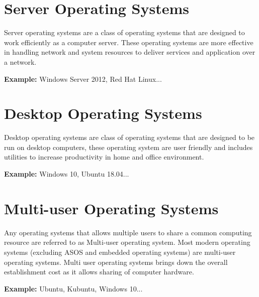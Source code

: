 \documentclass[a4,11pt]{article}
\begin{document}
\begin{multicols}{2}
  \section{Server Operating Systems}

  Server operating systems are a class of operating systems that are
  designed to work efficiently as a computer server. These operating
  systems are more effective in handling network and system resources
  to deliver services and application over a network.

  \textbf{Example:} Windows Server 2012, Red Hat Linux...
  \section{Desktop Operating Systems}
  Desktop operating systems are class of operating systems that are
  designed to be run on desktop computers, these operating system are
  user friendly and includes utilities to increase productivity in
  home and office environment.

  \textbf{Example:} Windows 10, Ubuntu 18.04...
  \section{Multi-user Operating Systems}
  Any operating systems that allows multiple users to share a common
  computing resource are referred to as Multi-user operating
  system. Most modern operating systems (excluding ASOS and embedded
  operating systems) are multi-user operating systems. Multi user
  operating systems brings down the overall establishment cost as it
  allows sharing of computer hardware.

  \textbf{Example:} Ubuntu, Kubuntu, Windows 10...
\end{multicols}
\end{document}
